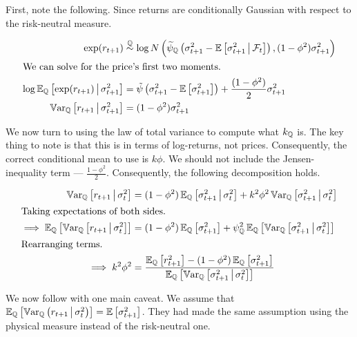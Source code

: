 \documentclass[11pt, letterpaper, twoside, final]{article}
\begin{document}
First, note the following. 
Since returns are conditionally Gaussian with respect to the risk-neutral measure. 

\begin{align} 
    \label{eqn:expectations}
    \exp(r_{t+1}) &\stackrel{\QQ}{\sim} \log \N\left(\widetilde{\psi}_{\QQ}\left(\sigma^2_{t+1} -
    \E\left[\sigma^2_{t+1} \mvert \F_t\right]\right) , (1 - \phi^2) \sigma^2_{t+1}\right) \\
%
    \intertext{We can solve for the price's first two moments.}
    \log \E_{\QQ}\left[\exp(r_{t+1}) \mvert \sigma^2_{t+1} \right] &= \tilde{\psi}\left( \sigma^2_{t+1} -
    \E\left[\sigma^2_{t+1}\right] \right)+ \frac{(1 - \phi^2)}{2} \sigma^2_{t+1}  \\
%
    \Var_{\QQ}\left[r_{t+1} \mvert \sigma^2_{t+1} \right] &= (1 - \phi^2) \sigma_{t+1}^2 
\end{align}


We now turn to using the law of total variance to compute what $k_{\mathbb{Q}}$ is. 
The key thing to note is that this is in terms of log-returns, not prices.
Consequently, the correct conditional mean to use is $k \phi$. 
We should not include the Jensen-inequality term --- $\frac{1 - \phi^2}{2}$.
Consequently, the following decomposition holds.


\begin{align}
    \Var_{\QQ}\left[r_{t+1} \mvert \sigma^2_t\right]  &= (1 - \phi^2) \E_{\QQ}\left[\sigma^2_{t+1} \mvert
    \sigma^2_t \right] + k^2 \phi^2 \Var_{\QQ}\left[\sigma^2_{t+1} \mvert \sigma^2_t \right]  \\
%
    \intertext{Taking expectations of both sides.}
%
    \implies \E_{\QQ}\left[\Var_{\QQ}\left[r_{t+1} \mvert \sigma^2_t\right]\right]  &= (1 - \phi^2)
    \E_{\QQ}\left[\sigma^2_{t+1} \right] + \psi_{\QQ}^2 \E_{\QQ}\left[\Var_{\QQ}\left[\sigma^2_{t+1} \mvert
    \sigma^2_t \right]\right]  \\
%
    \intertext{Rearranging terms.}
%
    \implies k^2 \phi^2 &= \frac{\E_{\QQ}\left[r^2_{t+1} \right] -  (1 - \phi^2) \E_{\QQ}\left[\sigma^2_{t+1}
    \right]}{\E_{\QQ}\left[\Var_{\QQ}\left[\sigma^2_{t+1} \mvert \sigma^2_t \right]\right]}
    \label{eqn:psi_qq_as_corr}
\end{align}

We now follow \textcite{khrapov2016affine} with one main caveat. 
We assume that $\operatorname{\mathbb{E}}_{\mathbb{Q}}\left[\operatorname{\mathbb{V}ar}_{\mathbb{Q}}\left(r_{t+1} \,\middle\vert\, \sigma^2_t\right)\right] =
\operatorname{\mathbb{E}}\left[\sigma^2_{t+1}\right]$.
They had made the same assumption using the physical measure instead of the risk-neutral one.
\end{document}
